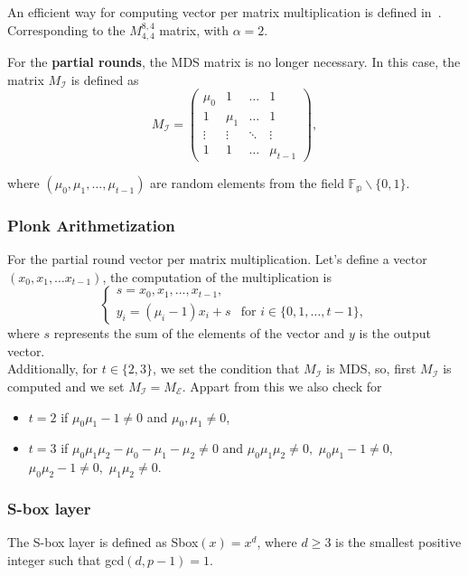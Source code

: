 An efficient way for computing vector per matrix multiplication is defined in~\cite{duval2018mds}. Corresponding to the $M_{4,4}^{8,4}$ matrix, with $\alpha = 2$.

For the \textbf{partial rounds}, the MDS matrix is no longer necessary. In this case, the matrix $M_\mathcal{I}$ is defined as
\begin{equation}
    M_{\mathcal{I}} = 
    \begin{pmatrix}
        \mu_0 & 1 & \dots & 1 \\
        1 & \mu_1 & \dots & 1 \\
        \vdots & \vdots & \ddots & \vdots \\
        1 & 1 & \dots & \mu_{t-1}
    \end{pmatrix}
    ,
\end{equation}

where $\left(\mu_0,\mu_1,\dots,\mu_{t-1}\right)$ are random elements from the field $\mathbb{F_p}\backslash\{0,1\}$.

\subsubsection*{Plonk Arithmetization}
For the partial round vector per matrix multiplication. Let's define a vector $\left(x_0,x_1,\dots x_{t-1}\right)$, the computation of the multiplication is
\begin{equation}
    \begin{cases}
        s = x_0,x_1,\dots ,x_{t-1}, \\
        y_i = \left(\mu_i-1\right)x_i+s & \text{for }i\in \{0,1,\dots,t-1\},
    \end{cases}
\end{equation}
where $s$ represents the sum of the elements of the vector and $y$ is the output vector.\\
Additionally, for $t\in\{2,3\}$, we set the condition that $M_\mathcal{I}$ is MDS, so, first $M_{\mathcal{I}}$ is computed and we set $M_{\mathcal{I}} = M_{\mathcal{E}}$. Appart from this we also check for
\begin{itemize}
    \item $t=2$ if $\mu_0\mu_1-1 \neq 0$ and $\mu_0,\mu_1 \neq 0$,
    \item $t=3$ if $\mu_0\mu_1\mu_2-\mu_0-\mu_1-\mu_2 \neq 0$ and
        $\mu_0\mu_1\mu_2\neq0,$  $\mu_0\mu_1-1\neq0,$ $\mu_0\mu_2-1\neq0,$ $\mu_1\mu_2\neq0$.
\end{itemize}

\subsubsection*{S-box layer}
The S-box layer is defined as Sbox$(x) = x^d$, where $d\geq3$ is the smallest positive integer such that gcd$\left(d,p-1\right)=1$.

